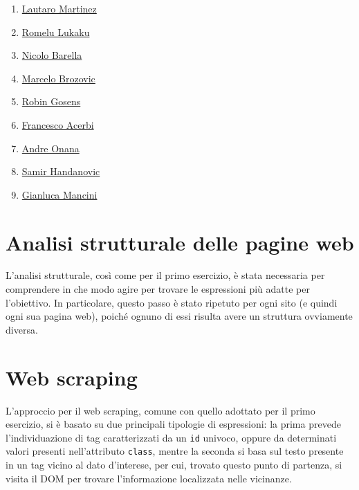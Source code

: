 \begin{enumerate}
    \begin{enumerate}
        \item \href{https://www.footballdatabase.eu/en/player/details/279784-lautaro-martinez}{Lautaro Martinez}
        \item \href{https://www.footballdatabase.eu/en/player/details/70663-romelu-lukaku}{Romelu Lukaku}
        \item \href{https://www.footballdatabase.eu/en/player/details/252538-nicolo-barella}{Nicolo Barella}
        \item \href{https://www.footballdatabase.eu/en/player/details/112559-marcelo-brozovic}{Marcelo Brozovic}
        \item \href{https://www.footballdatabase.eu/en/player/details/223558-robin-gosens}{Robin Gosens}
        \item \href{https://www.footballdatabase.eu/en/player/details/110489-francesco-acerbi}{Francesco Acerbi}
        \item \href{https://www.footballdatabase.eu/en/player/details/244843-andre-onana}{Andre Onana}
        \item \href{https://www.footballdatabase.eu/en/player/details/11916-samir-handanovic}{Samir Handanovic}
        \item \href{https://www.footballdatabase.eu/en/player/details/244461-gianluca-mancini}{Gianluca Mancini}
    \end{enumerate}
\end{enumerate}

\section{Analisi strutturale delle pagine web}
L'analisi strutturale, così come per il primo esercizio, è stata necessaria per comprendere in che modo agire per trovare le espressioni più adatte per l'obiettivo. In particolare, questo passo è stato ripetuto per ogni sito (e quindi ogni sua pagina web), poiché ognuno di essi risulta avere un struttura ovviamente diversa.

\section{Web scraping}
L'approccio per il web scraping, comune con quello adottato per il primo esercizio, si è basato su due principali tipologie di espressioni: la prima prevede l'individuazione di tag caratterizzati da un \texttt{id} univoco, oppure da determinati valori presenti nell'attributo \texttt{class}, mentre la seconda si basa sul testo presente in un tag vicino al dato d'interese, per cui, trovato questo punto di partenza, si visita il DOM per trovare l'informazione localizzata nelle vicinanze.

